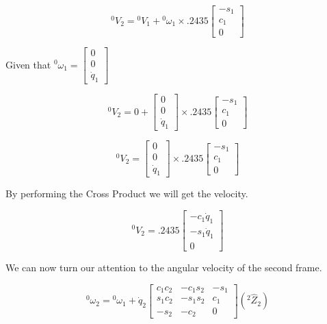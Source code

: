 $$
{}^{0}V_{2} = {}^{0}V_{1} + {}^{0}\omega_{1} \times .2435 \begin{bmatrix} -s_1 \\ c_1 \\ 0
\end{bmatrix}
$$


\noindent Given that ${}^{0}\omega_1 = \left[\begin{array}{c} 0 \\  0 \\ \dot{q}_{1} \end{array}\right]$


$$
{}^{0}V_{2} = 0 + \left[\begin{array}{c} 0 \\  0 \\ \dot{q}_{1} \end{array}\right] \times .2435 \begin{bmatrix} -s_1 \\ c_1 \\ 0
\end{bmatrix}
$$



$$
{}^{0}V_{2} = \left[\begin{array}{c} 0 \\  0 \\ \dot{q}_{1} \end{array}\right] \times .2435 \begin{bmatrix} -s_1 \\ c_1 \\ 0
\end{bmatrix}
$$

\noindent By performing the Cross Product we will get the velocity.

$$
{}^{0}V_{2} = .2435 \begin{bmatrix} -c_1\dot{q}_1 \\ -s_1\dot{q}_1 \\ 0\end{bmatrix}
$$

\noindent We can now turn our attention to the angular velocity of the second frame.

$$
{}^{0}\omega_2 = {}^{0}\omega_{1} + \dot{q}_{2} \left[\begin{array}{ccc}
c_{1} c_{2} & -c_{1} s_{2} & -s_{1} \\
s_{1} c_{2} & -s_{1} s_{2} & c_{1} \\
-s_{2} & -c_{2} & 0
\end{array}\right] \left( {}^{2}\hat{Z}_{2}\right)
$$


